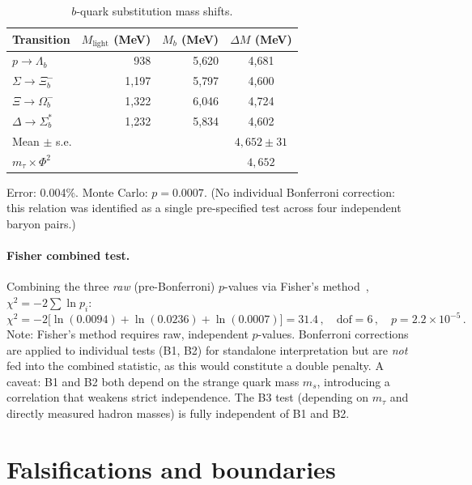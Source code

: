 \documentclass[11pt,a4paper]{article}
\begin{document}
\begin{table}[H]
\centering
\caption{$b$-quark substitution mass shifts.}
\label{tab:bsubst}
\begin{tabular}{@{}lrrc@{}}
\toprule
Transition & $M_\text{light}$ (MeV) & $M_b$ (MeV) & $\Delta M$ (MeV) \\
\midrule
$p \to \Lambda_b$       & 938   & 5{,}620 & 4{,}681 \\
$\Sigma \to \Xi_b^-$    & 1{,}197 & 5{,}797 & 4{,}600 \\
$\Xi \to \Omega_b^-$    & 1{,}322 & 6{,}046 & 4{,}724 \\
$\Delta \to \Sigma_b^*$ & 1{,}232 & 5{,}834 & 4{,}602 \\
\midrule
\multicolumn{3}{l}{Mean $\pm$ s.e.} & $4{,}652 \pm 31$ \\
\multicolumn{3}{l}{$m_\tau \times \Phi^2$} & $4{,}652$ \\
\bottomrule
\end{tabular}
\end{table}

\noindent
Error: 0.004\%. Monte Carlo: $p = 0.0007$.
(No individual Bonferroni correction: this relation was identified
as a single pre-specified test across four independent baryon pairs.)

\paragraph{Fisher combined test.}
Combining the three \emph{raw} (pre-Bonferroni) $p$-values via
Fisher's method~\cite{Fisher1934},
$\chi^2 = -2\sum \ln p_i$:
\begin{equation}
  \chi^2 = -2\bigl[\ln(0.0094) + \ln(0.0236) + \ln(0.0007)\bigr]
  = 31.4\,, \quad
  \text{dof} = 6\,, \quad
  p = 2.2 \times 10^{-5}\,.
\end{equation}
Note: Fisher's method requires raw, independent $p$-values. Bonferroni
corrections are applied to individual tests (B1, B2) for standalone
interpretation but are \emph{not} fed into the combined statistic, as
this would constitute a double penalty. A caveat: B1 and B2 both
depend on the strange quark mass $m_s$, introducing a correlation
that weakens strict independence. The B3 test (depending on $m_\tau$
and directly measured hadron masses) is fully independent of B1 and B2.

\section{Falsifications and boundaries}
\label{sec:falsify}
\end{document}

